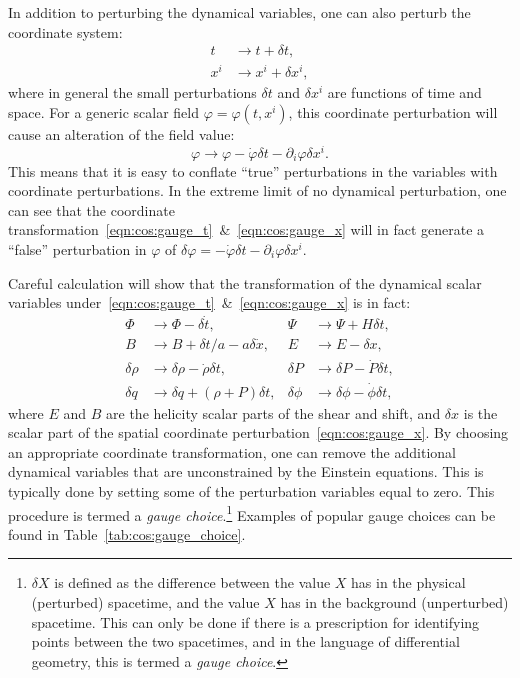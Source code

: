 In addition to perturbing the dynamical variables, one can also perturb the coordinate system:
\begin{align}
  t &\rightarrow t + \delta t,
  \label{eqn:cos:gauge_t}
  \\
  x^i &\rightarrow x^i  + \delta x^i,
  \label{eqn:cos:gauge_x}
\end{align}
where in general the small perturbations \(\delta t\) and \(\delta x^i\) are functions of time and space.
For a generic scalar field \(\varphi = \varphi(t,x^i)\), this coordinate perturbation will cause an alteration of the field value:
\begin{equation}
  \varphi \rightarrow \varphi - \dot{\varphi}\delta t - \partial_i\varphi\delta x^i.
\end{equation}
This means that it is easy to conflate ``true'' perturbations in the variables with coordinate perturbations. In the extreme limit of no dynamical perturbation, one can see that the coordinate transformation~\eqref{eqn:cos:gauge_t}~\&~\eqref{eqn:cos:gauge_x} will in fact generate a ``false'' perturbation in \(\varphi\) of \(\delta\varphi = -\dot{\varphi}\delta t - \partial_i\varphi\delta x^i\).

Careful calculation will show that the transformation of the dynamical scalar variables under~\eqref{eqn:cos:gauge_t}~\&~\eqref{eqn:cos:gauge_x} is in fact:
\begin{align}
  \Phi &\rightarrow \Phi - \delta \dot{t}, &
  \Psi &\rightarrow \Psi +H \delta t  \nonumber,\\
  B &\rightarrow B + \delta t/a - a\delta \dot{x}, &
  E &\rightarrow E - \delta x \nonumber,\\
  \delta\rho &\rightarrow \delta\rho - \dot{\rho}\delta t, &
  \delta P &\rightarrow \delta P - \dot{P}\delta t \nonumber,\\
  \delta q &\rightarrow \delta q + (\rho+P)\delta t,&
  \delta \phi &\rightarrow \delta \phi - \dot{\phi}\delta t,
\end{align}
where \(E\) and \(B\) are the helicity scalar parts of the shear and shift, and \(\delta x\) is the scalar part of the spatial coordinate perturbation~\eqref{eqn:cos:gauge_x}.
By choosing an appropriate coordinate transformation, one can remove the additional dynamical variables that are unconstrained by the Einstein equations. This is typically done by setting some of the perturbation variables equal to zero. This procedure is termed a {\em gauge choice}.\footnote{\(\delta X\) is defined as the difference between the value \(X\) has in the physical (perturbed) spacetime, and the value \(X\) has in the background (unperturbed) spacetime. This can only be done if there is a prescription for identifying points between the two spacetimes, and in the language of differential geometry, this is termed a {\em gauge choice}.}
Examples of popular gauge choices can be found in Table~\ref{tab:cos:gauge_choice}.

